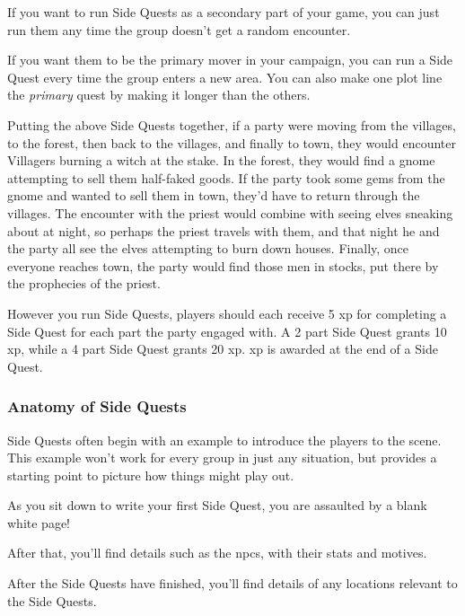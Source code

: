 \begin{multicols}{2}
If you want to run Side Quests as a secondary part of your game, you can just run them any time the group doesn't get a random encounter.

If you want them to be the primary mover in your campaign, you can run a Side Quest every time the group enters a new area.
You can also make one plot line the \emph{primary} quest by making it longer than the others.

Putting the above Side Quests together, if a party were moving from the villages, to the forest, then back to the villages, and finally to town, they would 
encounter Villagers burning a witch at the stake.
In the forest, they would find a gnome attempting to sell them half-faked goods.
If the party took some gems from the gnome and wanted to sell them in town, they'd have to return through the villages.
The encounter with the priest would combine with seeing elves sneaking about at night, so perhaps the priest travels with them, and that night he and the party all see the elves attempting to burn down houses.
Finally, once everyone reaches town, the party would find those men in stocks, put there by the prophecies of the priest.

However you run Side Quests, players should each receive 5 \gls{xp} for completing a Side Quest for each part the party engaged with.
A 2 part Side Quest grants 10 \gls{xp}, while a 4 part Side Quest grants 20 \gls{xp}.
\Gls{xp} is awarded at the end of a Side Quest.

\subsubsection{Anatomy of Side Quests}

Side Quests often begin with an example to introduce the players to the scene.
This example won't work for every group in just any situation, but provides a starting point to picture how things might play out.

\begin{boxtext}

	As you sit down to write your first Side Quest, you are assaulted by a blank white page!

\end{boxtext}

After that, you'll find details such as the \glspl{npc}, with their stats and motives.

After the Side Quests have finished, you'll find details of any locations relevant to the Side Quests.


\end{multicols}
